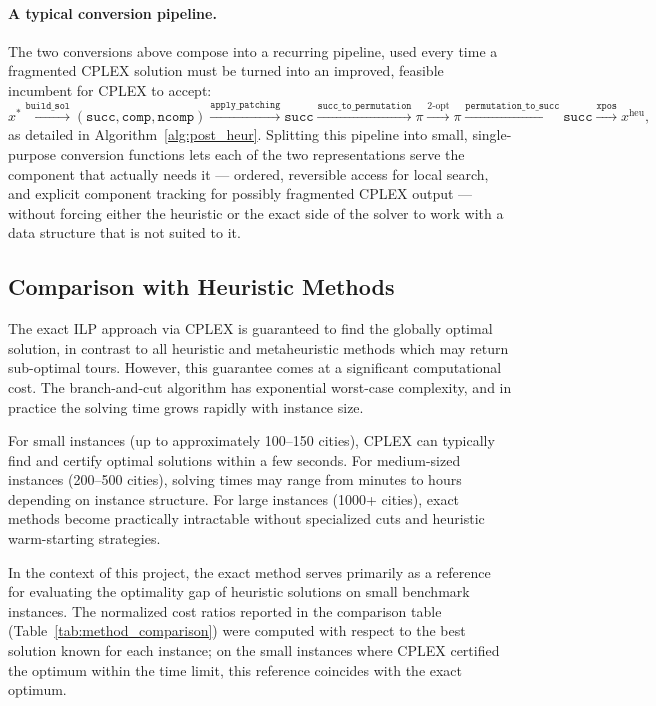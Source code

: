 \documentclass{article}
\begin{document}
\paragraph{A typical conversion pipeline.}
The two conversions above compose into a recurring pipeline, used every time a fragmented
CPLEX solution must be turned into an improved, feasible incumbent for CPLEX to accept:
\[
x^* \xrightarrow{\texttt{build\_sol}} (\texttt{succ}, \texttt{comp}, \texttt{ncomp})
\xrightarrow{\texttt{apply\_patching}} \texttt{succ}
\xrightarrow{\texttt{succ\_to\_permutation}} \pi
\xrightarrow{\text{2-opt}} \pi
\xrightarrow{\texttt{permutation\_to\_succ}} \texttt{succ}
\xrightarrow{\texttt{xpos}} x^{\text{heu}},
\]
as detailed in Algorithm~\ref{alg:post_heur}. Splitting this pipeline into small,
single-purpose conversion functions lets each of the two representations serve the component
that actually needs it --- ordered, reversible access for local search, and explicit component
tracking for possibly fragmented CPLEX output --- without forcing either the heuristic or the
exact side of the solver to work with a data structure that is not suited to it.

\subsection{Comparison with Heuristic Methods}

The exact ILP approach via CPLEX is guaranteed to find the globally optimal solution, in
contrast to all heuristic and metaheuristic methods which may return sub-optimal tours.
However, this guarantee comes at a significant computational cost. The branch-and-cut
algorithm has exponential worst-case complexity, and in practice the solving time grows
rapidly with instance size.

For small instances (up to approximately 100--150 cities), CPLEX can typically find and
certify optimal solutions within a few seconds. For medium-sized instances (200--500 cities),
solving times may range from minutes to hours depending on instance structure. For large
instances (1000+ cities), exact methods become practically intractable without specialized
cuts and heuristic warm-starting strategies.

In the context of this project, the exact method serves primarily as a reference for
evaluating the optimality gap of heuristic solutions on small benchmark instances. The
normalized cost ratios reported in the comparison table (Table~\ref{tab:method_comparison})
were computed with respect to the best solution known for each instance; on the small
instances where CPLEX certified the optimum within the time limit, this reference coincides
with the exact optimum.
\end{document}
